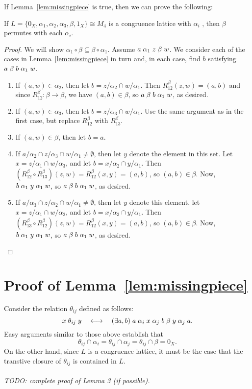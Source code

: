 If Lemma~\ref{lem:missingpiece} is true, then we can prove the following:
\begin{theorem}
If $L = \{0_X, \alpha_1, \alpha_2, \alpha_3, \beta, 1_X\} \cong  M_4$ is a
congruence lattice with $\alpha_i$ \pppc, then $\beta$ permutes with each $\alpha_i$.
\end{theorem}
\begin{proof}
We will show $\alpha_1 \circ \beta \subseteq \beta \circ \alpha_1$.
Assume $a \mathrel{\alpha}_1 z \mathrel{\beta} w$.  We consider each of the cases in
Lemma~\ref{lem:missingpiece} in turn and,
in each case, find $b$ satisfying $a \mathrel{\beta} b \mathrel{\alpha}_1 w$.
\begin{enumerate}
\item If $(a,w) \in \alpha_2$, then let $b = z/\alpha_2 \cap w/\alpha_1$.  Then
$R^\beta_{12}(z,w) = (a,b)$ and since 
$R^\beta_{12}: \beta \rightarrow \beta$, we have $(a,b) \in \beta$, so 
$a \mathrel{\beta} b \mathrel{\alpha}_1 w$, as desired.  
\item If $(a,w) \in \alpha_3$, then let $b = z/\alpha_3 \cap w/\alpha_1$. Use the same
argument as in the first case, but replace $R^\beta_{12}$ with $R^\beta_{13}$. 
\item If $(a,w) \in \beta$, then let $b = a$. 
\item If  $a/\alpha_2 \cap z/\alpha_3 \cap w/\alpha_1 \neq \emptyset$, then let
  $y$ denote the element in this set.  Let $x = z/\alpha_1 \cap w/\alpha_3$, and
  let $b = x/\alpha_2\cap y/\alpha_1$.  
  Then $(R^\beta_{12}\circ R^\beta_{13})(z,w) = R^\beta_{12}(x,y) = (a,b)$, so $(a,b) \in \beta$.
  Now, $b\mathrel{\alpha}_1 y \mathrel{\alpha}_1 w$, so
  $a \mathrel{\beta} b \mathrel{\alpha}_1 w$, as desired.
\item If $a/\alpha_3 \cap z/\alpha_2 \cap w/\alpha_1 \neq \emptyset$, then let 
  $y$ denote this element, let $x = z/\alpha_1 \cap w/\alpha_2$, and
  let $b = x/\alpha_3\cap y/\alpha_1$.  
  Then $(R^\beta_{13}\circ R^\beta_{12})(z,w) = R^\beta_{12}(x,y) = (a,b)$, so $(a,b) \in \beta$.
  Now, $b\mathrel{\alpha}_1 y \mathrel{\alpha}_1 w$, so $a \mathrel{\beta} b \mathrel{\alpha}_1 w$, as desired.
\end{enumerate}
\end{proof}

\section{Proof of Lemma~\ref{lem:missingpiece}}
Consider the relation $\theta_{ij}$ defined as follows:
\[
x \mathrel{\theta}_{ij} y \quad \longleftrightarrow \quad (\exists a, b) \;
a \mathrel{\alpha}_i x \mathrel{\alpha}_j b \mathrel{\beta} y \mathrel{\alpha}_j a.
\]
Easy arguments similar to those above establish that 
\[
\theta_{ij} \cap \alpha_i = \theta_{ij} \cap \alpha_j =
\theta_{ij} \cap \beta = 0_X.\]
On the other hand, since $L$ is a congruence lattice, it must be the case that
the transtive closure of $\theta_{ij}$ is contained in $L$.\\
\\
{\it TODO: complete proof of Lemma 3 (if possible).}

